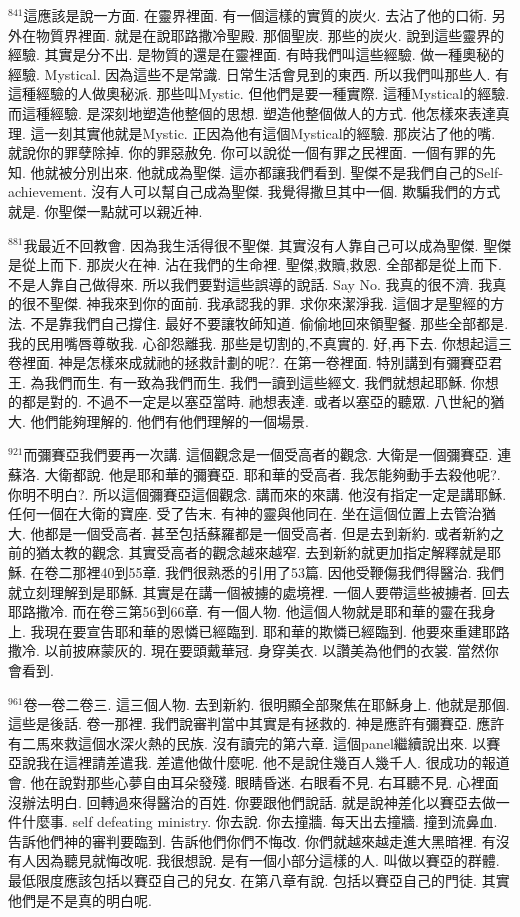 \documentclass{book}
\begin{document}
$^{841}$這應該是說一方面.
在靈界裡面.
有一個這樣的實質的炭火.
去沾了他的口術.
另外在物質界裡面.
就是在說耶路撒冷聖殿.
那個聖炭.
那些的炭火.
說到這些靈界的經驗.
其實是分不出.
是物質的還是在靈裡面.
有時我們叫這些經驗.
做一種奧秘的經驗.
Mystical.
因為這些不是常識.
日常生活會見到的東西.
所以我們叫那些人.
有這種經驗的人做奧秘派.
那些叫Mystic.
但他們是要一種實際.
這種Mystical的經驗.
而這種經驗.
是深刻地塑造他整個的思想.
塑造他整個做人的方式.
他怎樣來表達真理.
這一刻其實他就是Mystic.
正因為他有這個Mystical的經驗.
那炭沾了他的嘴.
就說你的罪孽除掉.
你的罪惡赦免.
你可以說從一個有罪之民裡面.
一個有罪的先知.
他就被分別出來.
他就成為聖傑.
這亦都讓我們看到.
聖傑不是我們自己的Self-achievement.
沒有人可以幫自己成為聖傑.
我覺得撒旦其中一個.
欺騙我們的方式就是.
你聖傑一點就可以親近神.

$^{881}$我最近不回教會.
因為我生活得很不聖傑.
其實沒有人靠自己可以成為聖傑.
聖傑是從上而下.
那炭火在神.
沾在我們的生命裡.
聖傑,救贖,救恩.
全部都是從上而下.
不是人靠自己做得來.
所以我們要對這些誤導的說話.
Say No.
我真的很不濟.
我真的很不聖傑.
神我來到你的面前.
我承認我的罪.
求你來潔淨我.
這個才是聖經的方法.
不是靠我們自己撐住.
最好不要讓牧師知道.
偷偷地回來領聖餐.
那些全部都是.
我的民用嘴唇尊敬我.
心卻怨離我.
那些是切割的,不真實的.
好,再下去.
你想起這三卷裡面.
神是怎樣來成就祂的拯救計劃的呢?.
在第一卷裡面.
特別講到有彌賽亞君王.
為我們而生.
有一致為我們而生.
我們一讀到這些經文.
我們就想起耶穌.
你想的都是對的.
不過不一定是以塞亞當時.
祂想表達.
或者以塞亞的聽眾.
八世紀的猶大.
他們能夠理解的.
他們有他們理解的一個場景.

$^{921}$而彌賽亞我們要再一次講.
這個觀念是一個受高者的觀念.
大衛是一個彌賽亞.
連蘇洛.
大衛都說.
他是耶和華的彌賽亞.
耶和華的受高者.
我怎能夠動手去殺他呢?.
你明不明白?.
所以這個彌賽亞這個觀念.
講而來的來講.
他沒有指定一定是講耶穌.
任何一個在大衛的寶座.
受了告末.
有神的靈與他同在.
坐在這個位置上去管治猶大.
他都是一個受高者.
甚至包括蘇羅都是一個受高者.
但是去到新約.
或者新約之前的猶太教的觀念.
其實受高者的觀念越來越窄.
去到新約就更加指定解釋就是耶穌.
在卷二那裡40到55章.
我們很熟悉的引用了53篇.
因他受鞭傷我們得醫治.
我們就立刻理解到是耶穌.
其實是在講一個被擄的處境裡.
一個人要帶這些被擄者.
回去耶路撒冷.
而在卷三第56到66章.
有一個人物.
他這個人物就是耶和華的靈在我身上.
我現在要宣告耶和華的恩憐已經臨到.
耶和華的欺憐已經臨到.
他要來重建耶路撒冷.
以前披麻蒙灰的.
現在要頭戴華冠.
身穿美衣.
以讚美為他們的衣裳.
當然你會看到.

$^{961}$卷一卷二卷三.
這三個人物.
去到新約.
很明顯全部聚焦在耶穌身上.
他就是那個.
這些是後話.
卷一那裡.
我們說審判當中其實是有拯救的.
神是應許有彌賽亞.
應許有二馬來救這個水深火熱的民族.
沒有讀完的第六章.
這個panel繼續說出來.
以賽亞說我在這裡請差遣我.
差遣他做什麼呢.
他不是說住幾百人幾千人.
很成功的報道會.
他在說對那些心夢自由耳朵發殘.
眼睛昏迷.
右眼看不見.
右耳聽不見.
心裡面沒辦法明白.
回轉過來得醫治的百姓.
你要跟他們說話.
就是說神差化以賽亞去做一件什麼事.
self defeating ministry.
你去說.
你去撞牆.
每天出去撞牆.
撞到流鼻血.
告訴他們神的審判要臨到.
告訴他們你們不悔改.
你們就越來越走進大黑暗裡.
有沒有人因為聽見就悔改呢.
我很想說.
是有一個小部分這樣的人.
叫做以賽亞的群體.
最低限度應該包括以賽亞自己的兒女.
在第八章有說.
包括以賽亞自己的門徒.
其實他們是不是真的明白呢.
\end{document}
